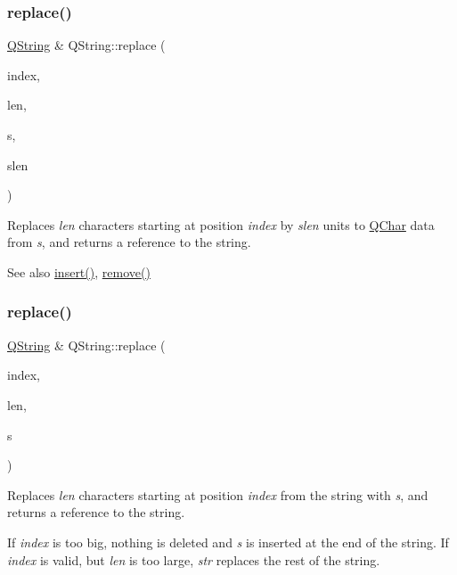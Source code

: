 \subsubsection{\texorpdfstring{replace()}{replace()}\hspace{0.1cm}{\footnotesize\ttfamily [2/3]}}
{\footnotesize\ttfamily \mbox{\hyperlink{class_q_string}{Q\+String}} \& Q\+String\+::replace (\begin{DoxyParamCaption}\item[{uint}]{index,  }\item[{uint}]{len,  }\item[{const \mbox{\hyperlink{class_q_char}{Q\+Char}} $\ast$}]{s,  }\item[{uint}]{slen }\end{DoxyParamCaption})}

Replaces {\itshape len} characters starting at position {\itshape index} by {\itshape slen} units to \mbox{\hyperlink{class_q_char}{Q\+Char}} data from {\itshape s}, and returns a reference to the string.

\begin{DoxySeeAlso}{See also}
\mbox{\hyperlink{class_q_string_a3733066010481ab1e8f037bd99045269}{insert()}}, \mbox{\hyperlink{class_q_string_afd08aabf1d9b04a3fef298290af04cbd}{remove()}} 
\end{DoxySeeAlso}
\mbox{\label{class_q_string_aa785aa8e254ae8704f1a960245f3337e}} 
\subsubsection{\texorpdfstring{replace()}{replace()}\hspace{0.1cm}{\footnotesize\ttfamily [3/3]}}
{\footnotesize\ttfamily \mbox{\hyperlink{class_q_string}{Q\+String}} \& Q\+String\+::replace (\begin{DoxyParamCaption}\item[{uint}]{index,  }\item[{uint}]{len,  }\item[{const \mbox{\hyperlink{class_q_string}{Q\+String}} \&}]{s }\end{DoxyParamCaption})}

Replaces {\itshape len} characters starting at position {\itshape index} from the string with {\itshape s}, and returns a reference to the string.

If {\itshape index} is too big, nothing is deleted and {\itshape s} is inserted at the end of the string. If {\itshape index} is valid, but {\itshape len} is too large, {\itshape str} replaces the rest of the string.


